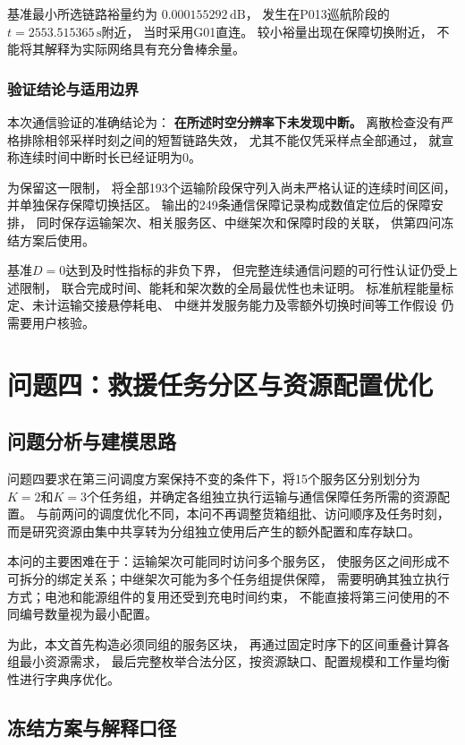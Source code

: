 \documentclass[bwprint]{gmcmthesis}
\begin{document}
基准最小所选链路裕量约为
$0.000155292\,\mathrm{dB}$，
发生在P013巡航阶段的
$t=2553.515365\,\mathrm{s}$附近，
当时采用G01直连。
较小裕量出现在保障切换附近，
不能将其解释为实际网络具有充分鲁棒余量。

\subsubsection{验证结论与适用边界}

本次通信验证的准确结论为：
\textbf{在所述时空分辨率下未发现中断。}
离散检查没有严格排除相邻采样时刻之间的短暂链路失效，
尤其不能仅凭采样点全部通过，
就宣称连续时间中断时长已经证明为0。

为保留这一限制，
将全部193个运输阶段保守列入尚未严格认证的连续时间区间，
并单独保存保障切换括区。
输出的249条通信保障记录构成数值定位后的保障安排，
同时保存运输架次、相关服务区、中继架次和保障时段的关联，
供第四问冻结方案后使用。

基准$D=0$达到及时性指标的非负下界，
但完整连续通信问题的可行性认证仍受上述限制，
联合完成时间、能耗和架次数的全局最优性也未证明。
标准航程能量标定、未计运输交接悬停耗电、
中继并发服务能力及零额外切换时间等工作假设
仍需要用户核验。

\section{问题四：救援任务分区与资源配置优化}

\subsection{问题分析与建模思路}

问题四要求在第三问调度方案保持不变的条件下，将15个服务区分别划分为
$K=2$和$K=3$个任务组，并确定各组独立执行运输与通信保障任务所需的资源配置。
与前两问的调度优化不同，本问不再调整货箱组批、访问顺序及任务时刻，
而是研究资源由集中共享转为分组独立使用后产生的额外配置和库存缺口。

本问的主要困难在于：运输架次可能同时访问多个服务区，
使服务区之间形成不可拆分的绑定关系；中继架次可能为多个任务组提供保障，
需要明确其独立执行方式；电池和能源组件的复用还受到充电时间约束，
不能直接将第三问使用的不同编号数量视为最小配置。

为此，本文首先构造必须同组的服务区块，
再通过固定时序下的区间重叠计算各组最小资源需求，
最后完整枚举合法分区，按资源缺口、配置规模和工作量均衡性进行字典序优化。

\subsection{冻结方案与解释口径}
\end{document}
